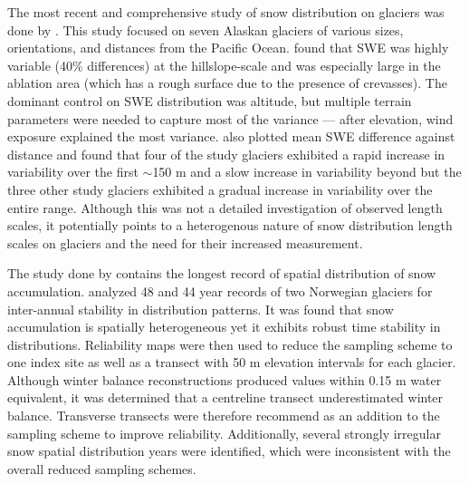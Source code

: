 \documentclass{sfuthesis}
\begin{document}
The most recent and comprehensive study of snow distribution on glaciers was done by \cite{McGrath2015}. This study focused on seven Alaskan glaciers of various sizes, orientations, and distances from the Pacific Ocean. \cite{McGrath2015} found that SWE was highly variable (40$\%$ differences) at the hillslope-scale and was especially large in the ablation area (which has a rough surface due to the presence of crevasses). The dominant control on SWE distribution was altitude, but multiple terrain parameters were needed to capture most of the variance --- after elevation, wind exposure explained the most variance. \cite{McGrath2015} also plotted mean SWE difference against distance and found that four of the study glaciers exhibited a rapid increase in variability over the first $\sim$150 m and a slow increase in variability beyond but the three other study glaciers exhibited a gradual increase in variability over the entire range. Although this was not a detailed investigation of observed length scales, it potentially points to a heterogenous nature of snow distribution length scales on glaciers and the need for their increased measurement.

The study done by \cite{Walmsley2015} contains the longest record of spatial distribution of snow accumulation. \cite{Walmsley2015} analyzed 48 and 44 year records of two Norwegian glaciers for inter-annual stability in distribution patterns. It was found that snow accumulation is spatially heterogeneous yet it exhibits robust time stability in distributions. Reliability maps were then used to reduce the sampling scheme to one index site as well as a transect with 50 m elevation intervals for each glacier. Although winter balance reconstructions produced values within 0.15 m water equivalent, it was determined that a centreline transect underestimated winter balance. Transverse transects were therefore recommend as an addition to the sampling scheme to improve reliability. Additionally, several strongly irregular snow spatial distribution years were identified, which were inconsistent with the overall reduced sampling schemes. 
\end{document}
